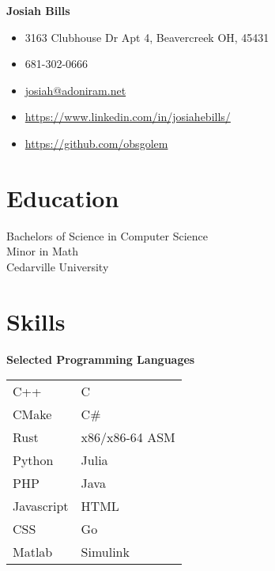 \documentclass[10pt]{article}
\begin{document}
    \begin{paracol}{2}
        \parbox[top][0.08\textheight][c]{\linewidth}{
            \textbf{\Huge{Josiah Bills}}
        }
        
        \switchcolumn
        
        \parbox[top][0.08\textheight][c]{\linewidth}{
            \begin{mdframed}[hidealllines=true,backgroundcolor=gray!20]
                \begin{itemize}[noitemsep]
                    \item[] 3163 Clubhouse Dr Apt 4, Beavercreek OH, 45431
                    \item[] 681-302-0666
                    \item[] \href{mailto://Josiah@adoniram.net}{josiah@adoniram.net}
                    \item[] \url{https://www.linkedin.com/in/josiahebills/}
                    \item[] \url{https://github.com/obsgolem}
                \end{itemize}
            \end{mdframed}
        }
        
        \switchcolumn

        \section*{Education}
        \parbox[top][][c]{\linewidth}{
            Bachelors of Science in Computer Science \\
            Minor in Math \\
            Cedarville University 
        }
        
        \section*{Skills}

        \parbox[top][][c]{\linewidth}{
            \begin{center}
                \textbf{Selected Programming Languages}
            \end{center}
            \begin{tabularx}{\linewidth}{YY}
                C++ & C \\
                CMake & C\# \\
                Rust & x86/x86-64 ASM \\
                Python & Julia \\
                PHP & Java \\
                Javascript & HTML \\
                CSS & Go \\
                Matlab & Simulink
            \end{tabularx}
            
}
\end{paracol}
\end{document}
